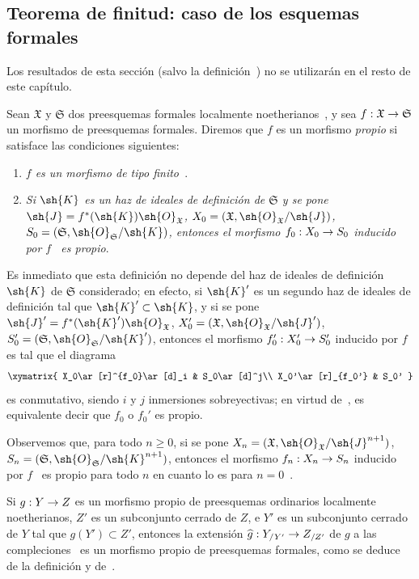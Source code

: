 \documentclass[oneside]{amsart}
\makeatletter
\renewcommand{\geq}{\geqslant}
\newcommand{\ega@arrow}[2]{\mathchoice{#1}{#2}{#2}{#2}}
\renewcommand{\to}{\ega@arrow{\longrightarrow}{\rightarrow}}
\newcommand{\oldpage}[2][]{{\marginnote{\normalfont\textbf{#1}~|~#2}}\ignorespaces}
\let\EGAOriginalLabel\label
\renewcommand{\label}[1]{\phantomsection\EGAOriginalLabel{#1}}
\makeatother
\begin{document}
\subsection{Teorema de finitud: caso de los esquemas formales}
\label{subsection:III.3.4}

\oldpage[III]{119}
Los resultados de esta sección (salvo la definición~) no se utilizarán en el resto de este capítulo.

\begin{env}[3.4.1]
\label{III.3.4.1}
Sean $\mathfrak{X}$ y $\mathfrak{S}$ dos preesquemas formales localmente noetherianos~, y sea $f:\mathfrak{X}\to\mathfrak{S}$ un morfismo de preesquemas formales.
Diremos que $f$ es un morfismo \emph{propio} si satisface las condiciones siguientes:
\begin{enumerate}
  \item[1.º] \emph{$f$ es un morfismo de tipo finito~}.
  \item[2.º] \emph{Si $\sh{K}$ es un haz de ideales de definición de $\mathfrak{S}$ y se pone $\sh{J}=f^*(\sh{K})\sh{O}_\mathfrak{X}$, $X_0=(\mathfrak{X},\sh{O}_\mathfrak{X}/\sh{J})$, $S_0=(\mathfrak{S},\sh{O}_\mathfrak{S}/\sh{K})$, entonces el morfismo $f_0:X_0\to S_0$ inducido por $f$~ es propio}.
\end{enumerate}
Es inmediato que esta definición no depende del haz de ideales de definición $\sh{K}$ de $\mathfrak{S}$ considerado; en efecto, si $\sh{K}'$ es un segundo haz de ideales de definición tal que $\sh{K}'\subset\sh{K}$, y si se pone $\sh{J}'=f^*(\sh{K}')\sh{O}_\mathfrak{X}$, $X_0'=(\mathfrak{X},\sh{O}_\mathfrak{X}/\sh{J}')$, $S_0'=(\mathfrak{S},\sh{O}_\mathfrak{S}/\sh{K}')$, entonces el morfismo $f_0':X_0'\to S_0'$ inducido por $f$ es tal que el diagrama
\[
  \xymatrix{
    X_0\ar[r]^{f_0}\ar[d]_i &
    S_0\ar[d]^j\\
    X_0'\ar[r]_{f_0'} &
    S_0'
  }
\]
es conmutativo, siendo $i$ y $j$ inmersiones sobreyectivas; en virtud de~, es equivalente decir que $f_0$ o $f_0'$ es propio.

Observemos que, para todo $n\geq 0$, si se pone $X_n=(\mathfrak{X},\sh{O}_\mathfrak{X}/\sh{J}^{n+1})$, $S_n=(\mathfrak{S},\sh{O}_\mathfrak{S}/\sh{K}^{n+1})$, entonces el morfismo $f_n:X_n\to S_n$ inducido por $f$~ es propio para todo $n$ en cuanto lo es para $n=0$~.

Si $g:Y\to Z$ es un morfismo propio de preesquemas ordinarios localmente noetherianos, $Z'$ es un subconjunto cerrado de $Z$, e $Y'$ es un subconjunto cerrado de $Y$ tal que $g(Y')\subset Z'$, entonces la extensión $\widehat{g}:Y_{/Y'}\to Z_{/Z'}$ de $g$ a las compleciones~ es un morfismo propio de preesquemas formales, como se deduce de la definición y de~.


\end{env}
\end{document}
